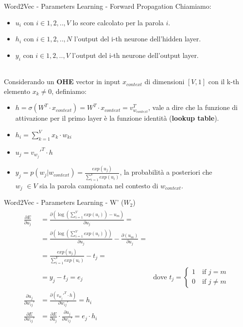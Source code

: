 \documentclass[british]{beamer}
\begin{document}
\begin{frame}{Word2Vec - Parameters Learning - Forward Propagation}
	Chiamiamo:
	\begin{itemize}
		\item \(u_i\) con \(i \in {1,2,..,V}\) lo score calcolato per la parola \(i\).
		\item \(h_i\) con \(i \in {1,2,..,N}\) l'output del i-th neurone dell'hidden layer.
		\item \(y_i\) con \(i \in {1,2,..,V}\) l'output del i-th neurone dell'output layer.
		\\~\\
	\end{itemize} 
	Considerando un \textbf{OHE} vector in input \(x_{context}\) di dimensioni \([V,1]\) con il k-th elemento \(x_k \neq 0\), definiamo:
	\begin{itemize}
		\item \(h = \sigma(W^T \cdot x_{context}) = W^T \cdot x_{context} = v_{w_{context}}^T\), vale a dire che la funzione di attivazione per il primo layer \`{e} la funzione identit\`{a} (\textbf{lookup table}).
		\item \(h_i = \sum_{k=1}^{V} x_k \cdot w_{ki}\)
		\item \(u_j = v_{w_j}'^T \cdot h\)
		\item \( y_{j} = p(w_{j}|w_{context}) =  \frac{exp(u_{j})}{\sum_{i=1}^{V} exp(u_i)}\), la probabilit\`{a} a posteriori che\\ \(w_{j}\) \(\in V\) sia la parola campionata nel contesto di \(w_{context}\).
	\end{itemize}
\end{frame}

\begin{frame}{Word2Vec - Parameters Learning - W' (\(W_2\))}
	\begin{gather*}
		\begin{align*}
		\frac{\partial E}{\partial u_j} 
		&= \frac{\partial \left( \log \left( \sum_{i=1}^{V} exp(u_i) \right) - u_m\right)}{\partial u_j} =
		\\
		&= \frac{\partial \left(\log \left( \sum_{i=1}^{V} exp(u_i) \right)\right)}{\partial u_j} - \frac{\partial \left( u_m\right)}{\partial u_j}= 
		\\
		&= \frac{exp(u_j)}{\sum_{i=1}^{V} exp(u_i)} - t_j= &
		\\
		&= y_j -t_j = e_j & \text{dove } 
		t_{j}=\begin{cases}
				1 \quad \text{if } j=m\\
				0 \quad \text{if } j\neq m
			\end{cases}
		\\
		\frac{\partial u_j}{\partial w_{ij}'} &= \frac{\partial \left( v_{w_j}'^T \cdot h\right)}{\partial w_{ij}'} = h_i
		\\
		\frac{\partial E}{\partial w_{ij}'} &= \frac{\partial E}{\partial u_j} \cdot \frac{\partial u_j}{\partial w_{ij}'} = e_j \cdot h_i
		\end{align*}		
	\end{gather*}
\end{frame}
\end{document}
